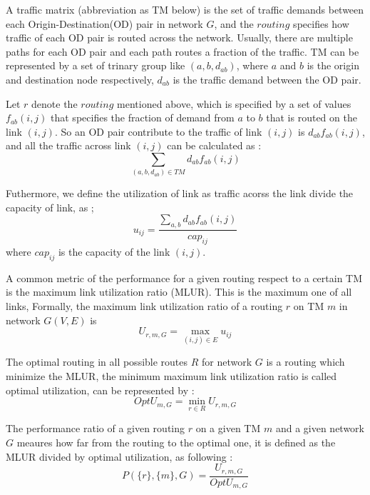 \documentclass[conference]{IEEEtran}
\begin{document}
A traffic matrix (abbreviation as TM below) is the set of traffic demands between each Origin-Destination(OD) pair in 
network $G$, and the $routing$ specifies how traffic of each OD pair is routed across the network. Usually, there are 
multiple paths for each OD pair and each path routes a fraction of the traffic.
TM can be represented by a set of trinary group like $(a, b, d_{ab})$, where $a$ and $b$ is the origin and 
destination node respectively, $d_{ab}$ is the traffic demand between the OD pair. 

Let $r$ denote the $routing$ mentioned above, which is specified by a set of values $f_{ab}(i,j)$ that specifies the 
fraction of demand from $a$ to $b$ that is routed on the link $(i,j)$. So an OD pair contribute to the traffic of 
link $(i,j)$ is $d_{ab}f_{ab}(i,j)$, and all the traffic across link $(i,j)$ can be calculated as :
\begin{equation}
	\sum_{(a,b,d_{ab})\in TM} d_{ab}f_{ab}(i,j)
\end{equation}

Futhermore, we define the utilization of link as traffic acorss the link divide the capacity of link, as ;
\begin{equation}
	u_{ij} = \frac{\sum_{a,b} d_{ab}f_{ab}(i,j)}{cap_{ij}}
\end{equation}
where $cap_{ij}$ is the capacity of the link $(i,j)$.

A common metric of the performance for a given routing respect to a certain TM is the maximum link utilization ratio (MLUR).
This is the maximum one of all links, Formally, the maximum link utilization ratio of a routing $r$ on 
TM $m$ in network $G(V,E)$ is 
\begin{equation}
	U_{r, m, G} = \max_{(i,j)\in E} u_{ij}
\end{equation}

The optimal routing in all possible routes $R$ for network $G$ is a routing which minimize the MLUR,
the minimum maximum link utilization ratio is called optimal utilization, can be represented by :
\begin{equation}
	OptU_{m, G} = \min_{r\in R} U_{r, m, G}
\end{equation}

The performance ratio of a given routing $r$ on a given TM $m$ and a given network $G$ meaures how far from the routing to
the optimal one, it is defined as the MLUR divided by optimal utilization, as following : 
\begin{equation}
	P(\{ r \},\{ m \}, G) = \frac{U_{r,m,G}}{OptU_{m,G}}
\end{equation}
\end{document}
